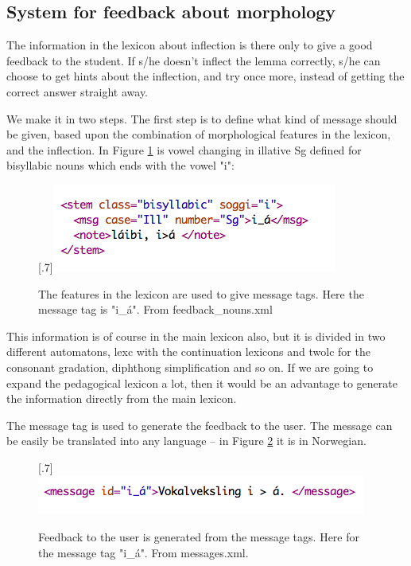 \documentclass[a4paper,12pt]{article}
\begin{document}
\subsection{System for feedback about morphology}

The information in the lexicon about inflection is there only to give a good feedback to the student. If s/he doesn't inflect the lemma correctly, s/he can choose to get hints about the inflection, and try once more, instead of getting the correct answer straight away. 

We make it in two steps. The first step is to define what kind of message should be given, based upon the combination of morphological features in the lexicon, and the inflection. In Figure \ref{feedbacknouns} is vowel changing in illative Sg defined for bisyllabic nouns which ends with the vowel "i":


\begin{figure}[htbp]
\begin{center}
\scalebox{.7}[.7]{\includegraphics{img/feedback_nouns.png}}\\
\caption{The features in the lexicon are used to give message tags. Here the message tag is "i\_á". From feedback\_nouns.xml}
\label{feedbacknouns}
\end{center}
\end{figure}

This information is of course in the main lexicon also, but it is divided in two different automatons, lexc with the continuation lexicons and twolc for the consonant gradation, diphthong simplification and so on. If we are going to expand the pedagogical lexicon a lot, then it would be an advantage to generate the information directly from the main lexicon. 

The message tag is used to generate the feedback to the user. The message can be easily be translated into any language -- in Figure \ref{mess} it is in Norwegian.

\begin{figure}[htbp]
\begin{center}
\scalebox{.7}[.7]{\includegraphics{img/messages.png}}\\
\caption{Feedback to the user is generated from the message tags. Here for the message tag "i\_á". From messages.xml.}
\label{mess}
\end{center}
\end{figure}
\end{document}
